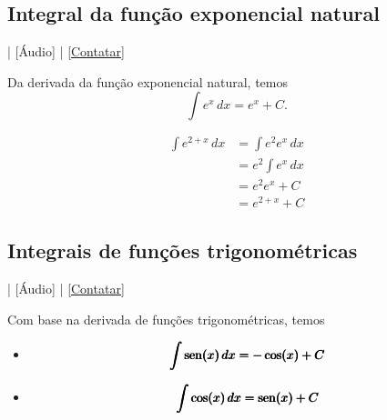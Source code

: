 \subsection{Integral da função exponencial natural}\label{cap_int_subsec_funexp}

\begin{flushright}
  [Vídeo] | [Áudio] | \href{https://phkonzen.github.io/notas/contato.html}{[Contatar]}
\end{flushright}

Da derivada da função exponencial natural, temos
\begin{equation}
  \int e^x\,dx = e^x + C.
\end{equation}

\begin{ex}
  \begin{align}
    \int e^{2 + x}\,dx &= \int e^2e^x\,dx \\
                       &= e^2\int e^x\,dx \\
                       &= e^2e^x + C \\
                       &= e^{2+x} + C
  \end{align}
\end{ex}

\subsection{Integrais de funções trigonométricas}\label{cap_int_sec_regrasbasic_trigo}

\begin{flushright}
  [Vídeo] | [Áudio] | \href{https://phkonzen.github.io/notas/contato.html}{[Contatar]}
\end{flushright}

Com base na derivada de funções trigonométricas, temos
\begin{itemize}
\item
  \begin{equation}
    \pmb{\int \operatorname{sen}(x)\,dx = -\cos(x) + C}
  \end{equation}
\item
  \begin{equation}
    \pmb{\int \cos(x)\,dx = \operatorname{sen}(x) + C}
  \end{equation}
\end{itemize}

